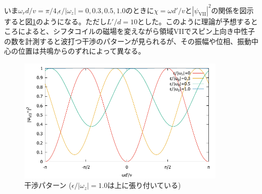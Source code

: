 いま$\omega_rd/v=\pi/4$,$\epsilon/|\omega_z|=0,0.3,0.5,1.0$のときに$\chi=\omega d'/v$と$|\psi_\mathrm{VII}|^2$の関係を図示すると図\ref{Nonreso_fig_interference}のようになる。ただし$L'/d=10$とした。このように理論が予想するところによると、シフタコイルの磁場を変えながら領域VIIでスピン上向き中性子の数を計測すると波打つ干渉のパターンが見られるが、その振幅や位相、振動中心の位置は共鳴からのずれによって異なる。

\begin{figure}[h]
\centering
\includegraphics[width=10cm]{nonreso/nonreso_interference.pdf}
\caption{干渉パターン {\footnotesize ($\epsilon/|\omega_z|=1.0$は上に張り付いている)}}
\label{Nonreso_fig_interference}
\vspace{-1cm}
\end{figure}



\renewcommand{\arraystretch}{1}


